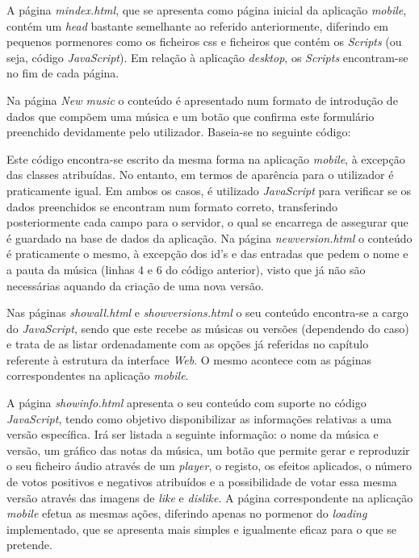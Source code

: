\documentclass[11pt,openany,twoside]{report}
\begin{document}
A página \textit{mindex.html}, que se apresenta como página inicial da aplicação \textit{mobile}, contém um \textit{head} bastante semelhante ao referido anteriormente, diferindo em pequenos pormenores como os ficheiros \acs{css} e ficheiros que contém os \textit{Scripts} (ou seja, código \textit{JavaScript}). Em relação à aplicação \textit{desktop}, os \textit{Scripts} encontram-se no fim de cada página.

Na página \textit{New music} o conteúdo é apresentado num formato de introdução de dados que compõem uma música e um botão que confirma este formulário preenchido devidamente pelo utilizador. Baseia-se no seguinte código:

Este código encontra-se escrito da mesma forma na aplicação \textit{mobile}, à excepção das classes atribuídas. No entanto, em termos de aparência para o utilizador é praticamente igual.
Em ambos os casos, é utilizado \textit{JavaScript} para verificar se os dados preenchidos se encontram num formato correto, transferindo posteriormente cada campo para o servidor, o qual se encarrega de assegurar que é guardado na base de dados da aplicação. Na página \textit{newversion.html} o conteúdo é praticamente o mesmo, à excepção dos id's e das entradas que pedem o nome e a pauta da música (linhas 4 e 6 do código anterior), visto que já não são necessárias aquando da criação de uma nova versão.

Nas páginas \textit{showall.html} e \textit{showversions.html} o seu conteúdo encontra-se a cargo do \textit{JavaScript}, sendo que este recebe as músicas ou versões (dependendo do caso) e trata de as listar ordenadamente com as opções já referidas no capítulo referente à estrutura da interface \textit{Web}. O mesmo acontece com as páginas correspondentes na aplicação \textit{mobile}.

A página \textit{showinfo.html} apresenta o seu conteúdo com suporte no código \textit{JavaScript}, tendo como objetivo disponibilizar as informações relativas a uma versão específica. Irá ser listada a seguinte informação: o nome da música e versão, um gráfico das notas da música, um botão que permite gerar e reproduzir o seu ficheiro áudio através de um \textit{player}, o registo, os efeitos aplicados, o número de votos positivos e negativos atribuídos e a possibilidade de votar essa mesma versão através das imagens de \textit{like} e \textit{dislike}. A página correspondente na aplicação \textit{mobile} efetua as mesmas ações, diferindo apenas no pormenor do \textit{loading} implementado, que se apresenta mais simples e igualmente eficaz para o que se pretende.
\end{document}
